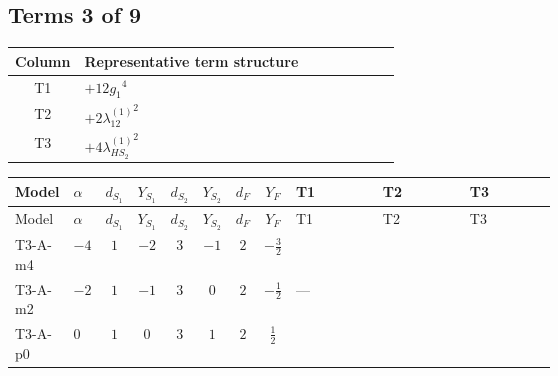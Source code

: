 \documentclass[8pt]{article}
\begin{document}
\begin{landscape}
\subsection*{Terms 3 of 9}
\begin{center}
\begin{tabular}{@{}c >{\raggedright\arraybackslash}p{0.82\linewidth}@{}}
\toprule
Column & Representative term structure \\
\midrule
T1 & \(\displaystyle +12 {g_1}^4\) \\
\midrule
T2 & \(\displaystyle +2 {\lambda_{12}^{(1)}}^2\) \\
\midrule
T3 & \(\displaystyle +4 {\lambda_{HS_2}^{(1)}}^2\) \\
\midrule
\bottomrule
\end{tabular}
\end{center}
\smallskip
\tiny
\begin{longtable}{@{}llcccccc >{\raggedright\arraybackslash}p{0.21\linewidth} >{\raggedright\arraybackslash}p{0.21\linewidth} >{\raggedright\arraybackslash}p{0.21\linewidth}@{}}
\toprule
Model & $\alpha$ & $d_{S_1}$ & $Y_{S_1}$ & $d_{S_2}$ & $Y_{S_2}$ & $d_F$ & $Y_F$ & T1 & T2 & T3 \\
\midrule
\endfirsthead
\toprule
Model & $\alpha$ & $d_{S_1}$ & $Y_{S_1}$ & $d_{S_2}$ & $Y_{S_2}$ & $d_F$ & $Y_F$ & T1 & T2 & T3 \\
\midrule
\endhead
T3-A-m4 & $-4$ & $1$ & $-2$ & $3$ & $-1$ & $2$ & $-\frac{3}{2}$ & \scriptsize\adjustbox{max width=\linewidth}{$\begin{gathered} +12 {g_1}^4\end{gathered}$} & \scriptsize\adjustbox{max width=\linewidth}{$\begin{gathered} +2 {\lambda_{12}^{(1)}}^2\end{gathered}$} & \scriptsize\adjustbox{max width=\linewidth}{$\begin{gathered} +4 {\lambda_{HS_2}^{(1)}}^2\end{gathered}$} \\
\midrule
T3-A-m2 & $-2$ & $1$ & $-1$ & $3$ & $0$ & $2$ & $-\frac{1}{2}$ & --- & \scriptsize\adjustbox{max width=\linewidth}{$\begin{gathered} +2 {\lambda_{12}^{(1)}}^2\end{gathered}$} & \scriptsize\adjustbox{max width=\linewidth}{$\begin{gathered} +4 {\lambda_{HS_2}^{(1)}}^2\end{gathered}$} \\
\midrule
T3-A-p0 & $0$ & $1$ & $0$ & $3$ & $1$ & $2$ & $\frac{1}{2}$ & \scriptsize\adjustbox{max width=\linewidth}{$\begin{gathered} +12 {g_1}^4\end{gathered}$} & \scriptsize\adjustbox{max width=\linewidth}{$\begin{gathered} +2 {\lambda_{12}^{(1)}}^2\end{gathered}$} & \scriptsize\adjustbox{max width=\linewidth}{$\begin{gathered} +4 {\lambda_{HS_2}^{(1)}}^2\end{gathered}$} \\

\end{longtable}
\end{landscape}
\end{document}

